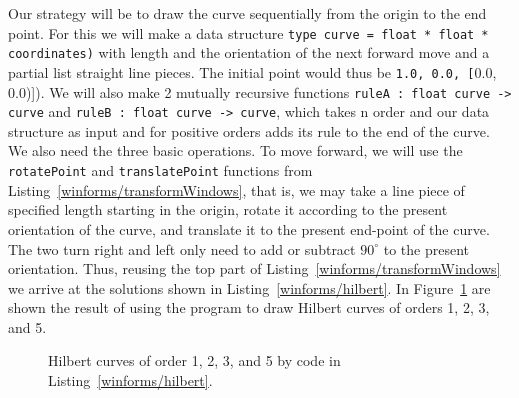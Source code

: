 Our strategy will be to draw the curve sequentially from the origin to the end point. For this we will make a data structure \lstinline!type curve = float * float * coordinates)! with length and the orientation of the next forward move and a partial list straight line pieces. The initial point would thus be \lstinline(1.0, 0.0, [(0.0, 0.0)]). We will also make 2 mutually recursive functions \lstinline!ruleA : float curve -> curve! and \lstinline!ruleB : float curve -> curve!, which takes n order and our data structure as input and for positive orders adds its rule to the end of the curve. We also need the three basic operations. To move forward, we will use the \lstinline!rotatePoint! and \lstinline!translatePoint! functions from Listing~\ref{winforms/transformWindows}, that is, we may take a line piece of specified length starting in the origin, rotate it according to the present orientation of the curve, and translate it to the present end-point of the curve. The two turn right and left only need to add or subtract $90^{\circ}$ to the present orientation. Thus, reusing the top part of Listing~\ref{winforms/transformWindows} we arrive at the solutions shown in Listing~\ref{winforms/hilbert}. In Figure~\ref{fig:hilbert} are shown the result of using the program to draw Hilbert curves of orders 1, 2, 3, and 5.
%
%
\begin{figure}
  \centering
  \caption{Hilbert curves of order 1, 2, 3, and 5 by code in Listing~\ref{winforms/hilbert}.}
  \label{fig:hilbert}
\end{figure}

